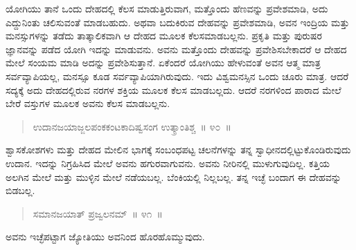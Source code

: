 
\vspace{0.1cm}

ಯೋಗಿಯು ತಾನೆ ಒಂದು ದೇಹದಲ್ಲಿ ಕೆಲಸ ಮಾಡುತ್ತಿರುವಾಗ, ಮತ್ತೊಂದು ಹೆಣವನ್ನು ಪ್ರವೇಶಮಾಡಿ, ಅದು ಎದ್ದುನಿಂತು ಚಲಿಸುವಂತೆ ಮಾಡಬಹುದು. ಅಥವಾ ಬದುಕಿರುವ ದೇಹವನ್ನು ಪ್ರವೇಶಮಾಡಿ, ಅವನ ಇಂದ್ರಿಯ ಮತ್ತು ಮನಸ್ಸುಗಳನ್ನು ತಡೆದು ತಾತ್ಕಾಲಿಕವಾಗಿ ಆ ದೇಹದ ಮೂಲಕ ಕೆಲಸಮಾಡಬಲ್ಲನು. ಪ್ರಕೃತಿ ಮತ್ತು ಪುರುಷರ ಜ್ಞಾನವನ್ನು ಪಡೆದ ಯೋಗಿ ಇದನ್ನು ಮಾಡುವನು. ಅವನು ಮತ್ತೊಂದು ದೇಹವನ್ನು ಪ್ರವೇಶಿಸಬೇಕಾದರೆ ಆ ದೇಹದ ಮೇಲೆ ಸಂಯಮ ಮಾಡಿ ಅದನ್ನು ಪ್ರವೇಶಿಸುತ್ತಾನೆ. ಏಕೆಂದರೆ ಯೋಗಿಯು ಹೇಳುವಂತೆ ಅವನ ಆತ್ಮ ಮಾತ್ರ ಸರ್ವವ್ಯಾಪಿಯಲ್ಲ, ಮನಸ್ಸೂ ಕೂಡ ಸರ್ವವ್ಯಾಪಿಯಾಗಿರುವುದು. ಇದು ವಿಶ್ವಮನಸ್ಸಿನ ಒಂದು ಚೂರು ಮಾತ್ರ. ಆದರೆ ಸದ್ಯಕ್ಕೆ ಅದು ದೇಹದಲ್ಲಿರುವ ನರಗಳ ಶಕ್ತಿಯ ಮೂಲಕ ಕೆಲಸ ಮಾಡಬಲ್ಲದು. ಆದರೆ ನರಗಳಿಂದ ಪಾರಾದ ಮೇಲೆ ಬೇರೆ ವಸ್ತುಗಳ ಮೂಲಕ ಅವನು ಕೆಲಸ ಮಾಡಬಲ್ಲನು. 


\newpage

\begin{verse}
ಉದಾನಜಯಾಜ್ಜಲಪಂಕಕಂಟಕಾದಿಷ್ವಸಂಗ ಉತ್ಕ್ರಾಂತಿಶ್ಚ~॥ ೪೦~॥
\end{verse}

\vspace{-0.4cm}


\vspace{0.1cm}

ಶ್ವಾಸಕೋಶಗಳು ಮತ್ತು ದೇಹದ ಮೇಲಿನ ಭಾಗಕ್ಕೆ ಸಂಬಂಧಪಟ್ಟ ಚಲನೆಗಳನ್ನು ತನ್ನ ಸ್ವಾಧೀನದಲ್ಲಿಟ್ಟುಕೊಂಡಿರುವುದು ಉದಾನ. ಇದನ್ನು ನಿಗ್ರಹಿಸಿದ ಮೇಲೆ ಅವನು ಹಗುರವಾಗುವನು. ಅವನು ನೀರಿನಲ್ಲಿ ಮುಳುಗುವುದಿಲ್ಲ. ಕತ್ತಿಯ ಅಲಗಿನ ಮೇಲೆ ಮತ್ತು ಮುಳ್ಳಿನ ಮೇಲೆ ನಡೆಯಬಲ್ಲ. ಬೆಂಕಿಯಲ್ಲಿ ನಿಲ್ಲಬಲ್ಲ. ತನ್ನ ಇಚ್ಛೆ ಬಂದಾಗ ಈ ದೇಹವನ್ನು ಬಿಡಬಲ್ಲ. 

\vspace{-0.3cm}

\begin{verse}
ಸಮಾನಜಯಾತ್​ ಪ್ರಜ್ವಲನಮ್​~॥ ೪೧~॥
\end{verse}

\vspace{-0.4cm}


\vspace{0.1cm}

ಅವನು ಇಚ್ಛೆಪಟ್ಟಾಗ ಜ್ಯೋತಿಯು ಅವನಿಂದ ಹೊರಹೊಮ್ಮುವುದು. 

\vspace{-0.2cm}

